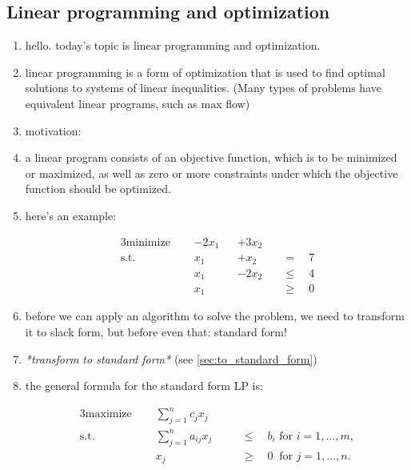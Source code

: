 \newpage
\subsection{Linear programming and optimization}

\begin{enumerate}

  \item hello. today's topic is linear programming and optimization.

  \item linear programming is a form of optimization that is used to find
    optimal solutions to systems of linear inequalities. (Many types of problems
    have equivalent linear programs, such as max flow)

  \item motivation: 

  \item a linear program consists of an objective function, which is to be
    minimized or maximized, as well as zero or more constraints under which the
    objective function should be optimized.


  \item here's an example:
    \begin{textred}
    \begin{alignat*}{3}
      \text{minimize } \quad& -2x_1 && +3 x_2  \quad&\\
      \text{s.t. }     \quad& x_1   && + x_2   \quad&=\quad 7\\
                            & x_1   && -2x_2   \quad&\leq\quad 4\\
                            & x_1   &&         \quad&\geq \quad0
    \end{alignat*}
    \end{textred}

  \item before we can apply an algorithm to solve the problem, we need to
    transform it to slack form, but before even that: standard form!

  \item \emph{*transform to standard form*} (see \cref{sec:to_standard_form})

  \item the general formula for the standard form LP is:
    \begin{textred}
    \begin{alignat*}{3}
      \text{maximize } \quad&\sum_{j = 1}^n c_j x_j&&\\
      \text{s.t. }     \quad&\sum_{j = 1}^n a_{ij}x_j \quad&& \leq \quad b_i   \text{ for } i = 1,\dots,m,\\
                       \quad& x_j                     \quad&& \geq \quad 0   \ \text{ for } j = 1,\dots,n.
    \end{alignat*}
    \end{textred}


\end{enumerate}
